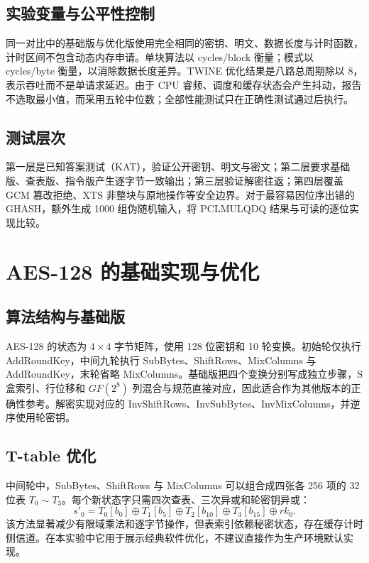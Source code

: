 \documentclass[a4paper,12pt]{ctexart}
\begin{document}
\subsection{实验变量与公平性控制}

同一对比中的基础版与优化版使用完全相同的密钥、明文、数据长度与计时函数，计时区间不包含动态内存申请。单块算法以 cycles/block 衡量；模式以 cycles/byte 衡量，以消除数据长度差异。TWINE 优化结果是八路总周期除以 8，表示吞吐而不是单请求延迟。由于 CPU 睿频、调度和缓存状态会产生抖动，报告不选取最小值，而采用五轮中位数；全部性能测试只在正确性测试通过后执行。

\subsection{测试层次}

第一层是已知答案测试（KAT），验证公开密钥、明文与密文；第二层要求基础版、查表版、指令版产生逐字节一致输出；第三层验证解密往返；第四层覆盖 GCM 篡改拒绝、XTS 非整块与原地操作等安全边界。对于最容易因位序出错的 GHASH，额外生成 1000 组伪随机输入，将 PCLMULQDQ 结果与可读的逐位实现比较。

\section{AES-128 的基础实现与优化}

\subsection{算法结构与基础版}

AES-128 的状态为 $4\times4$ 字节矩阵，使用 128 位密钥和 10 轮变换。初始轮仅执行 AddRoundKey，中间九轮执行 SubBytes、ShiftRows、MixColumns 与 AddRoundKey，末轮省略 MixColumns。基础版把四个变换分别写成独立步骤，S 盒索引、行位移和 $GF(2^8)$ 列混合与规范直接对应，因此适合作为其他版本的正确性参考。解密实现对应的 InvShiftRows、InvSubBytes、InvMixColumns，并逆序使用轮密钥。

\subsection{T-table 优化}

中间轮中，SubBytes、ShiftRows 与 MixColumns 可以组合成四张各 256 项的 32 位表 $T_0\sim T_3$。每个新状态字只需四次查表、三次异或和轮密钥异或：
\[
s'_0=T_0[b_0]\oplus T_1[b_5]\oplus T_2[b_{10}]\oplus T_3[b_{15}]\oplus rk_0.
\]
该方法显著减少有限域乘法和逐字节操作，但表索引依赖秘密状态，存在缓存计时侧信道。在本实验中它用于展示经典软件优化，不建议直接作为生产环境默认实现。
\end{document}
